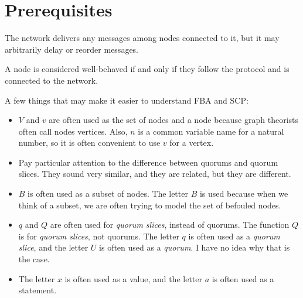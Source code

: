 \section{Prerequisites}

\begin{defn}[Network]\label{defn_network}
    The network delivers any messages among nodes connected to it, but it may arbitrarily delay or reorder messages.
\end{defn}

\begin{defn}
    A node is considered well-behaved if and only if they follow the protocol and is connected to the network.
\end{defn}

\begin{rem}
    A few things that may make it easier to understand FBA and SCP:
    \begin{itemize}
        \item
            $V$ and $v$ are often used as the set of nodes and a node because graph theorists often call nodes vertices.
            Also, $n$ is a common variable name for a natural number, so it is often convenient to use $v$ for a vertex.
        \item
            Pay particular attention to the difference between quorums and quorum slices.
            They sound very similar, and they are related, but they are different.
        \item
            $B$ is often used as a subset of nodes.
            The letter $B$ is used because when we think of a subset, we are often trying to model the set of befouled nodes.
        \item
            $q$ and $Q$ are often used for \textit{quorum slices}, instead of quorums.
            The function $Q$ is for \textit{quorum slices}, not quorums.
            The letter $q$ is often used as a \textit{quorum slice}, and the letter $U$ is often used as a \textit{quorum}.
            I have no idea why that is the case.
        \item
            The letter $x$ is often used as a value, and the letter $a$ is often used as a statement.
    \end{itemize}
\end{rem}
